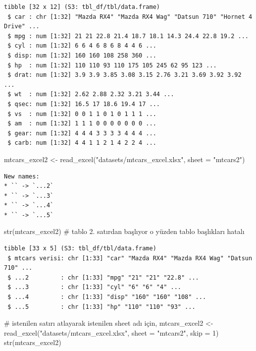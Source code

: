 \documentclass[
  letterpaper,
  DIV=11,
  numbers=noendperiod]{scrreprt}
\newenvironment{Shaded}{\begin{snugshade}}{\end{snugshade}}
\newcommand{\AttributeTok}[1]{\textcolor[rgb]{0.40,0.45,0.13}{#1}}
\newcommand{\CommentTok}[1]{\textcolor[rgb]{0.37,0.37,0.37}{#1}}
\newcommand{\DecValTok}[1]{\textcolor[rgb]{0.68,0.00,0.00}{#1}}
\newcommand{\FunctionTok}[1]{\textcolor[rgb]{0.28,0.35,0.67}{#1}}
\newcommand{\NormalTok}[1]{\textcolor[rgb]{0.00,0.23,0.31}{#1}}
\newcommand{\OtherTok}[1]{\textcolor[rgb]{0.00,0.23,0.31}{#1}}
\newcommand{\StringTok}[1]{\textcolor[rgb]{0.13,0.47,0.30}{#1}}
\begin{document}
\begin{verbatim}
tibble [32 x 12] (S3: tbl_df/tbl/data.frame)
 $ car : chr [1:32] "Mazda RX4" "Mazda RX4 Wag" "Datsun 710" "Hornet 4 Drive" ...
 $ mpg : num [1:32] 21 21 22.8 21.4 18.7 18.1 14.3 24.4 22.8 19.2 ...
 $ cyl : num [1:32] 6 6 4 6 8 6 8 4 4 6 ...
 $ disp: num [1:32] 160 160 108 258 360 ...
 $ hp  : num [1:32] 110 110 93 110 175 105 245 62 95 123 ...
 $ drat: num [1:32] 3.9 3.9 3.85 3.08 3.15 2.76 3.21 3.69 3.92 3.92 ...
 $ wt  : num [1:32] 2.62 2.88 2.32 3.21 3.44 ...
 $ qsec: num [1:32] 16.5 17 18.6 19.4 17 ...
 $ vs  : num [1:32] 0 0 1 1 0 1 0 1 1 1 ...
 $ am  : num [1:32] 1 1 1 0 0 0 0 0 0 0 ...
 $ gear: num [1:32] 4 4 4 3 3 3 3 4 4 4 ...
 $ carb: num [1:32] 4 4 1 1 2 1 4 2 2 4 ...
\end{verbatim}

\begin{Shaded}
\begin{Highlighting}[]
\NormalTok{mtcars\_excel2 }\OtherTok{\textless{}{-}} \FunctionTok{read\_excel}\NormalTok{(}\StringTok{"datasets/mtcars\_excel.xlsx"}\NormalTok{,}
                            \AttributeTok{sheet =} \StringTok{"mtcars2"}\NormalTok{)}
\end{Highlighting}
\end{Shaded}

\begin{verbatim}
New names:
* `` -> `...2`
* `` -> `...3`
* `` -> `...4`
* `` -> `...5`
\end{verbatim}

\begin{Shaded}
\begin{Highlighting}[]
\FunctionTok{str}\NormalTok{(mtcars\_excel2) }\CommentTok{\# tablo 2. satırdan başlıyor o yüzden tablo başlıkları hatalı}
\end{Highlighting}
\end{Shaded}

\begin{verbatim}
tibble [33 x 5] (S3: tbl_df/tbl/data.frame)
 $ mtcars verisi: chr [1:33] "car" "Mazda RX4" "Mazda RX4 Wag" "Datsun 710" ...
 $ ...2         : chr [1:33] "mpg" "21" "21" "22.8" ...
 $ ...3         : chr [1:33] "cyl" "6" "6" "4" ...
 $ ...4         : chr [1:33] "disp" "160" "160" "108" ...
 $ ...5         : chr [1:33] "hp" "110" "110" "93" ...
\end{verbatim}

\begin{Shaded}
\begin{Highlighting}[]
\CommentTok{\# istenilen satırı atlayarak istenilen sheet adı için,}
\NormalTok{mtcars\_excel2 }\OtherTok{\textless{}{-}} \FunctionTok{read\_excel}\NormalTok{(}\StringTok{"datasets/mtcars\_excel.xlsx"}\NormalTok{,}
                            \AttributeTok{sheet =} \StringTok{"mtcars2"}\NormalTok{,}
                            \AttributeTok{skip =} \DecValTok{1}\NormalTok{)}
\FunctionTok{str}\NormalTok{(mtcars\_excel2)}
\end{Highlighting}
\end{Shaded}
\end{document}

